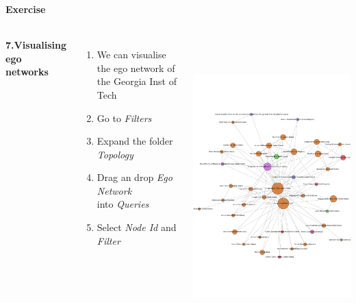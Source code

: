 \documentclass[8pt]{beamer}
\begin{document}

\begin{frame}
\frametitle{\insertsection}
\framesubtitle{Exercise}

\begin{columns}

\textbf{7.Visualising ego networks}
\begin{enumerate}
    \item We can visualise the ego network of the Georgia Inst of Tech
	\item Go to \textit{Filters}
	\item Expand the folder \textit{Topology}
	\item Drag an drop \textit{Ego Network}\\
		  into \textit{Queries}
	\item Select \textit{Node Id} and \textit{Filter}
\end{enumerate}


\footnotesize
\centering
\includegraphics[height = 1.3\textwidth]{gephi_ego}

\end{columns}

\end{frame}
\end{document}
